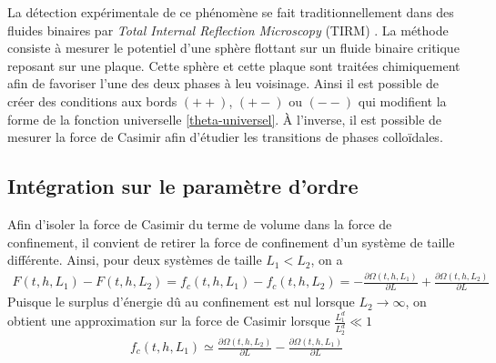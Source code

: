 La détection expérimentale de ce phénomène se fait traditionnellement dans des fluides binaires par \textit{Total Internal Reflection Microscopy} (TIRM) \cite{fukuto_critical_2005,hertlein_direct_2008,gambassi_critical_2009,edison_critical_2015-1}. La méthode consiste à mesurer le potentiel d'une sphère flottant sur un fluide binaire critique reposant sur une plaque. Cette sphère et cette plaque sont traitées chimiquement afin de favoriser l'une des deux phases à leu voisinage. Ainsi il est possible de créer des conditions aux bords $(++)$, $(+-)$ ou $(--)$ qui modifient la forme de la fonction universelle \ref{theta-universel}. À l'inverse, il est possible de mesurer la force de Casimir \cite{nguyen_controlling_2013} afin d'étudier les transitions de phases colloïdales.



    \subsection{Intégration sur le paramètre d'ordre}

Afin d'isoler la force de Casimir du terme de volume dans la force de confinement, il convient de retirer la force de confinement d'un système de taille différente. Ainsi, pour deux systèmes de taille $L_1 \less L_2$, on a 
\begin{align}
    F(t,h,L_1) - F(t,h,L_2) = f_c(t,h,L_1) - f_c(t,h,L_2) =  - \frac{\partial \Omega(t,h,L_1)}{\partial L}  + \frac{\partial \Omega(t,h,L_2)}{\partial L} 
\end{align}
Puisque le surplus d'énergie dû au confinement est nul lorsque $L_2\to \infty$, on obtient une approximation sur la force de Casimir lorsque $\frac{L_1^d}{L_2^d} \ll 1$ 
\begin{align}
    f_c(t,h,L_1) \simeq  \frac{\partial \Omega(t,h,L_2)}{\partial L}  - \frac{\partial \Omega(t,h,L_1)}{\partial L} 
    \label{casimir-diff-omega}   
\end{align}

